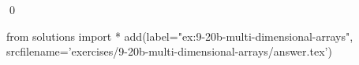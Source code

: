 
\begin{ex} 
  \label{ex:9-20b-multi-dimensional-arrays}
  
  \qed
\end{ex} 
\begin{python0}
from solutions import *
add(label="ex:9-20b-multi-dimensional-arrays",
    srcfilename='exercises/9-20b-multi-dimensional-arrays/answer.tex') 
\end{python0}
